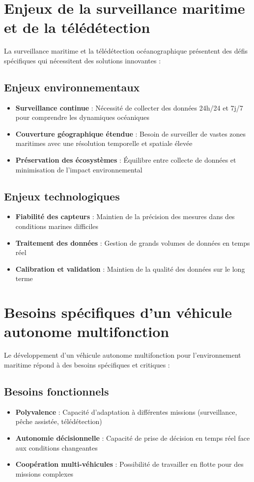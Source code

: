 {\section{Enjeux de la surveillance maritime et de la télédétection}
La surveillance maritime et la télédétection océanographique présentent des défis spécifiques qui nécessitent des solutions innovantes :

\subsection{Enjeux environnementaux}
\begin{itemize}
    \item \textbf{Surveillance continue} : Nécessité de collecter des données 24h/24 et 7j/7 pour comprendre les dynamiques océaniques
    \item \textbf{Couverture géographique étendue} : Besoin de surveiller de vastes zones maritimes avec une résolution temporelle et spatiale élevée
    \item \textbf{Préservation des écosystèmes} : Équilibre entre collecte de données et minimisation de l'impact environnemental
\end{itemize}

\subsection{Enjeux technologiques}
\begin{itemize}
    \item \textbf{Fiabilité des capteurs} : Maintien de la précision des mesures dans des conditions marines difficiles
    \item \textbf{Traitement des données} : Gestion de grands volumes de données en temps réel
    \item \textbf{Calibration et validation} : Maintien de la qualité des données sur le long terme
\end{itemize}

\section{Besoins spécifiques d'un véhicule autonome multifonction}
Le développement d'un véhicule autonome multifonction pour l'environnement maritime répond à des besoins spécifiques et critiques :

\subsection{Besoins fonctionnels}
\begin{itemize}
    \item \textbf{Polyvalence} : Capacité d'adaptation à différentes missions (surveillance, pêche assistée, télédétection)
    \item \textbf{Autonomie décisionnelle} : Capacité de prise de décision en temps réel face aux conditions changeantes
    \item \textbf{Coopération multi-véhicules} : Possibilité de travailler en flotte pour des missions complexes
\end{itemize}

}
